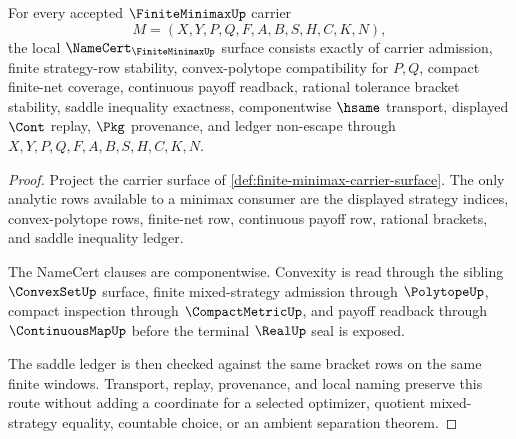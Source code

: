 \begin{theorem}
\label{thm:finite-minimax-namecert-obligations}
For every accepted $\FiniteMinimaxUp$ carrier
$$
M=(X,Y,P,Q,F,A,B,S,H,C,K,N),
$$
the local $\NameCert_{\FiniteMinimaxUp}$ surface consists exactly of carrier admission, finite strategy-row stability, convex-polytope compatibility for $P,Q$, compact finite-net coverage, continuous payoff readback, rational tolerance bracket stability, saddle inequality exactness, componentwise $\hsame$ transport, displayed $\Cont$ replay, $\Pkg$ provenance, and ledger non-escape through $X,Y,P,Q,F,A,B,S,H,C,K,N$.
\end{theorem}
\begin{proof}
Project the carrier surface of \autoref{def:finite-minimax-carrier-surface}. The only analytic rows available to a minimax consumer are the displayed strategy indices, convex-polytope rows, finite-net row, continuous payoff row, rational brackets, and saddle inequality ledger.

The NameCert clauses are componentwise. Convexity is read through the sibling $\ConvexSetUp$ surface, finite mixed-strategy admission through $\PolytopeUp$, compact inspection through $\CompactMetricUp$, and payoff readback through $\ContinuousMapUp$ before the terminal $\RealUp$ seal is exposed.

The saddle ledger is then checked against the same bracket rows on the same finite windows. Transport, replay, provenance, and local naming preserve this route without adding a coordinate for a selected optimizer, quotient mixed-strategy equality, countable choice, or an ambient separation theorem.
\end{proof}


\begin{closurestatus}{\FiniteMinimaxUp}
  \theoryclosure{\seedClosure}
  \formalstatus{\unformalizedV}
\end{closurestatus}
